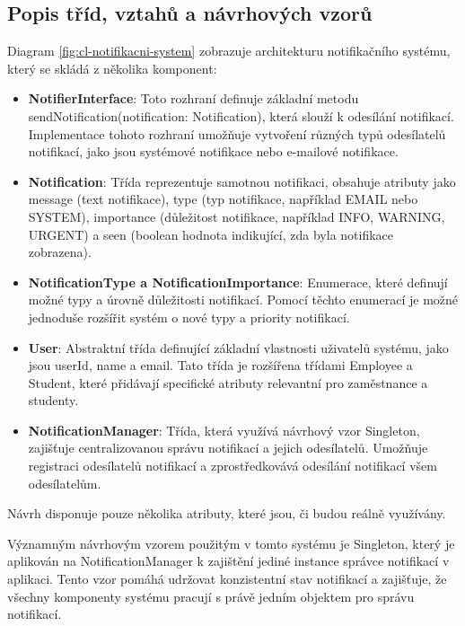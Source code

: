 \subsection*{Popis tříd, vztahů a návrhových vzorů}
Diagram \ref{fig:cl-notifikacni-system} zobrazuje architekturu notifikačního systému, který se skládá z několika komponent:
\begin{itemize}
    \item \textbf{NotifierInterface}: Toto rozhraní definuje základní metodu sendNotification(notification: Notification), která slouží k odesílání notifikací. Implementace tohoto rozhraní umožňuje vytvoření různých typů odesílatelů notifikací, jako jsou systémové notifikace nebo e-mailové notifikace.

    \item \textbf{Notification}: Třída reprezentuje samotnou notifikaci, obsahuje atributy jako message (text notifikace), type (typ notifikace, například EMAIL nebo SYSTEM), importance (důležitost notifikace, například INFO, WARNING, URGENT) a seen (boolean hodnota indikující, zda byla notifikace zobrazena).
    
    \item \textbf{NotificationType a NotificationImportance}: Enumerace, které definují možné typy a úrovně důležitosti notifikací. Pomocí těchto enumerací je možné jednoduše rozšířit systém o nové typy a priority notifikací.
    
    \item \textbf{User}: Abstraktní třída definující základní vlastnosti uživatelů systému, jako jsou userId, name a email. Tato třída je rozšířena třídami Employee a Student, které přidávají specifické atributy relevantní pro zaměstnance a studenty.
    
    \item \textbf{NotificationManager}: Třída, která využívá návrhový vzor Singleton, zajišťuje centralizovanou správu notifikací a jejich odesílatelů. Umožňuje registraci odesílatelů notifikací a zprostředkovává odesílání notifikací všem odesílatelům.
\end{itemize}
Návrh disponuje pouze několika atributy, které jsou, či budou reálně využívány.

Významným návrhovým vzorem použitým v tomto systému je Singleton, který je aplikován na NotificationManager k zajištění jediné instance správce notifikací v aplikaci. Tento vzor pomáhá udržovat konzistentní stav notifikací a zajišťuje, že všechny komponenty systému pracují s právě jedním objektem pro správu notifikací.
